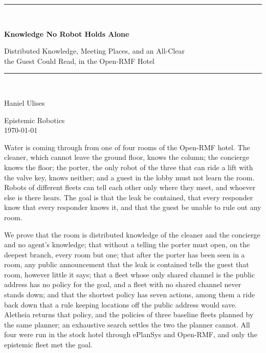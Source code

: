 \documentclass[11pt,a4paper]{article}
\theoremstyle{definition}
\begin{document}
\begin{titlepage}
\centering
\vspace*{2.4cm}
{\color{rulegrey}\rule{\textwidth}{0.8pt}}\\[0.9cm]
{\LARGE\bfseries Knowledge No Robot Holds Alone\par}
\vspace{0.5cm}
{\large\color{slate} Distributed Knowledge, Meeting Places, and an All-Clear\\
the Guest Could Read, in the Open-RMF Hotel\par}
\vspace{0.7cm}
{\color{rulegrey}\rule{\textwidth}{0.8pt}}\\[1.4cm]

{\large Haniel Ulises\par}
\vspace{0.3cm}
{\color{slate} Epistemic Robotics}\\
\vspace{0.15cm}
{\color{slate}\today}

\vfill
{\color{slate}\small
Water is coming through from one of four rooms of the Open-RMF hotel. The
cleaner, which cannot leave the ground floor, knows the column; the concierge
knows the floor; the porter, the only robot of the three that can ride a lift
with the valve key, knows neither; and a guest in the lobby must not learn the
room. Robots of different fleets can tell each other only where they meet, and
whoever else is there hears. The goal is that the leak be contained, that every
responder know that every responder knows it, and that the guest be unable to
rule out any room.

\vspace{0.6em}
We prove that the room is distributed knowledge of the cleaner and the
concierge and no agent's knowledge; that without a telling the porter must
open, on the deepest branch, every room but one; that after the porter has been
seen in a room, any public announcement that the leak is contained tells the
guest that room, however little it says; that a fleet whose only shared channel
is the public address has no policy for the goal, and a fleet with no shared
channel never stands down; and that the shortest policy has seven actions,
among them a ride back down that a rule keeping locations off the public
address would save. Aletheia returns that policy, and the policies of three
baseline fleets planned by the same planner; an exhaustive search settles the
two the planner cannot. All four were run in the stock hotel through ePlanSys
and Open-RMF, and only the epistemic fleet met the goal.}
\vspace{1.2cm}
\end{titlepage}
\end{document}
